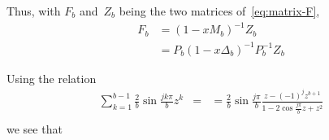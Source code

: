 \documentclass{article}
\begin{document}
Thus, with $F_b$ and~$Z_b$ being the two matrices of~\eqref{eq:matrix-F},
\begin{align}
F_b
&= (1 - x M_b)^{-1} Z_b\\
&= P_b (1 - x Δ_b)^{-1} P_b^{-1} Z_b
\end{align}

Using the relation
\begin{align}
∑_{k=1}^{b-1} \frac{2}{b} \sin \frac{jkπ}{b} z^k
&=
&= \frac{2}{b} \sin \frac{jπ}{b} \frac{z-(-1)^j z^{b+1}}
	{1-2\cos \frac{jπ}{b} z + z^2}\\
\end{align}
we see that
\end{document}
